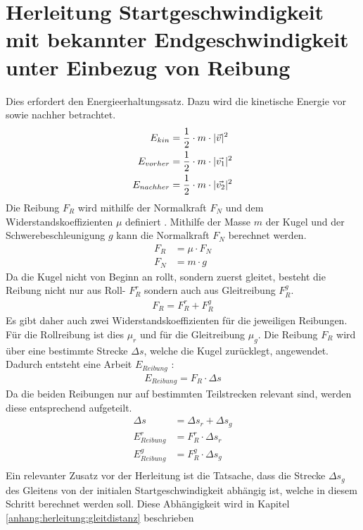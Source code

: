 \section{Herleitung Startgeschwindigkeit mit bekannter Endgeschwindigkeit unter Einbezug von Reibung}\label{anhang:herleitung:StartgeschwAnhandEndgeschwMitReibung}
Dies erfordert den Energieerhaltungssatz. Dazu wird die kinetische Energie vor sowie nachher betrachtet.
\begin{align}
    E_{kin} &= \frac{1}{2} \cdot m \cdot \lvert \vec{v} \rvert^2\\
    E_{vorher} &= \frac{1}{2} \cdot m \cdot \lvert \vec{v_1} \rvert^2\\
    E_{nachher} &= \frac{1}{2} \cdot m \cdot \lvert \vec{v_2} \rvert^2
\end{align}
Die Reibung $F_R$ wird mithilfe der Normalkraft $F_N$ und dem Widerstandskoeffizienten $\mu$ definiert \cite{wiki.rollreibung:1}.
Mithilfe der Masse $m$ der Kugel und der Schwerebeschleunigung $g$ kann die Normalkraft $F_N$ berechnet werden.
\begin{align}
    F_R &= \mu \cdot F_N\\
    F_N &= m \cdot g
\end{align}
Da die Kugel nicht von Beginn an rollt, sondern zuerst gleitet, besteht die Reibung nicht nur aus Roll- $F^r_R$ sondern auch aus
Gleitreibung $F^g_R$.
\begin{align}
    F_R = F^r_R + F^g_R
\end{align}
Es gibt daher auch zwei Widerstandskoeffizienten für die jeweiligen Reibungen. Für die Rollreibung ist dies $\mu_r$ und
für die Gleitreibung $\mu_g$.
Die Reibung $F_R$ wird über eine bestimmte Strecke $\Delta s$, welche die Kugel zurücklegt, angewendet.
Dadurch entsteht eine Arbeit $E_{Reibung}$ \cite{wiki.arbeit_physik:1}:
\begin{align}
    E_{Reibung} = F_R \cdot \Delta s
\end{align}
Da die beiden Reibungen nur auf bestimmten Teilstrecken relevant sind, werden diese entsprechend aufgeteilt.
\begin{align}
    \Delta s &= \Delta s_r + \Delta s_g\\
    E^r_{Reibung} &= F^r_R \cdot \Delta s_r\\
    E^g_{Reibung} &= F^g_R \cdot \Delta s_g\\
\end{align}
Ein relevanter Zusatz vor der Herleitung ist die Tatsache, dass die Strecke $\Delta s_g$ des Gleitens von der initialen
Startgeschwindigkeit abhängig ist, welche in diesem Schritt berechnet werden soll. Diese Abhängigkeit wird in Kapitel \ref{anhang:herleitung:gleitdistanz} beschrieben
